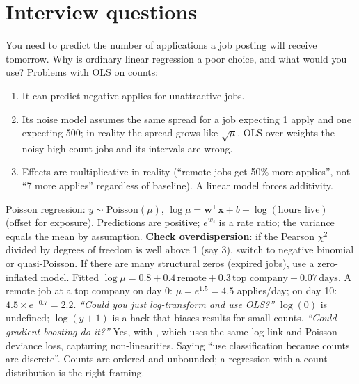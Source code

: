 \section{Interview questions}

\begin{qa}{ You need to predict the number of applications a job posting
will receive tomorrow. Why is ordinary linear regression a poor choice, and what would you use?}
\why
Problems with OLS on counts:
\begin{enumerate}
\item It can predict negative applies for unattractive jobs.
\item Its noise model assumes the same spread for a job expecting 1 apply and one expecting 500; in reality the spread
  grows like $\sqrt\mu$. OLS over-weights the noisy high-count jobs and its intervals are wrong.
\item Effects are multiplicative in reality (``remote jobs get 50\% more applies'', not ``7 more applies'' regardless
  of baseline). A linear model forces additivity.
\end{enumerate}
Poisson regression: $y\sim\text{Poisson}(\mu)$, $\log\mu = \mathbf w^\top\mathbf x + b + \log(\text{hours live})$ (offset
for exposure). Predictions are positive; $e^{w_j}$ is a rate ratio; the variance equals the mean by assumption.
\textbf{Check overdispersion}: if the Pearson $\chi^2$ divided by degrees of freedom is well above 1 (say 3), switch to
negative binomial or quasi-Poisson. If there are many structural zeros (expired jobs), use a zero-inflated model.
\worked Fitted $\log\mu = 0.8 + 0.4\,\text{remote} + 0.3\,\text{top\_company} - 0.07\,\text{days}$. A remote job at a
top company on day 0: $\mu = e^{1.5} = 4.5$ applies/day; on day 10: $4.5\times e^{-0.7} = 2.2$.
\pushes \emph{``Could you just log-transform and use OLS?''} $\log(0)$ is undefined; $\log(y+1)$ is a hack that biases
results for small counts. \emph{``Could gradient boosting do it?''} Yes, with , which uses the
same log link and Poisson deviance loss, capturing non-linearities.
\pitfall Saying ``use classification because counts are discrete''. Counts are ordered and unbounded; a regression with a
count distribution is the right framing.
\end{qa}

